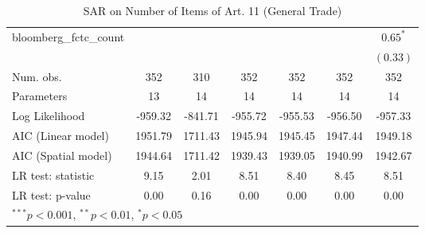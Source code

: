\begin{table}[!h]
\begin{center}
\begin{tabular}{l c c c c c c }
bloomberg\_fctc\_count  &              &              &              &              &              & $0.65^{*}$   \\
                        &              &              &              &              &              & $(0.33)$     \\
\midrule
Num. obs.               & 352          & 310          & 352          & 352          & 352          & 352          \\
Parameters              & 13           & 14           & 14           & 14           & 14           & 14           \\
Log Likelihood          & -959.32      & -841.71      & -955.72      & -955.53      & -956.50      & -957.33      \\
AIC (Linear model)      & 1951.79      & 1711.43      & 1945.94      & 1945.45      & 1947.44      & 1949.18      \\
AIC (Spatial model)     & 1944.64      & 1711.42      & 1939.43      & 1939.05      & 1940.99      & 1942.67      \\
LR test: statistic      & 9.15         & 2.01         & 8.51         & 8.40         & 8.45         & 8.51         \\
LR test: p-value        & 0.00         & 0.16         & 0.00         & 0.00         & 0.00         & 0.00         \\
\bottomrule
\multicolumn{7}{l}{\scriptsize{$^{***}p<0.001$, $^{**}p<0.01$, $^*p<0.05$}}
\end{tabular}
\caption{SAR on Number of Items of Art. 11 (General Trade)}
\label{table:coefficients}
\end{center}
\end{table}
